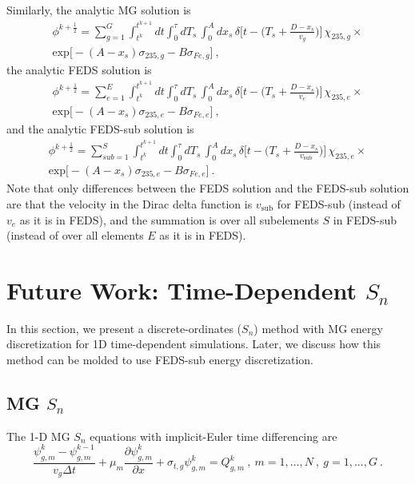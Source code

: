 \documentclass{article}
\begin{document}
Similarly, the analytic MG solution is 
\begin{multline}
\phi^{k+\frac{1}{2}} = \sum_{g=1}^G \int_{t^{k}}^{t^{k+1}} dt \int_0^{\tau} dT_s \, \int_0^A dx_s \, \delta\Big[t - \Big(T_s + \frac{D-x_s}{v_g}\Big)\Big] \, \chi_{235,g} \times \\ \text{exp}\big[-(A - x_s) \sigma_{235,g} - B \sigma_{Fe,g}\big]  \: ,
\end{multline}
the analytic FEDS solution is 
\begin{multline}
\phi^{k+\frac{1}{2}} = \sum_{e=1}^E \int_{t^{k}}^{t^{k+1}} dt \int_0^{\tau} dT_s \, \int_0^A dx_s \, \delta\Big[t - \Big(T_s + \frac{D-x_s}{v_e}\Big)\Big] \, \chi_{235,e} \times \\ \text{exp}\big[-(A - x_s) \sigma_{235,e} - B \sigma_{Fe,e}\big]  \: ,
\end{multline}
and the analytic FEDS-sub solution is 
\begin{multline}
\phi^{k+\frac{1}{2}} = \sum_{sub=1}^S \int_{t^{k}}^{t^{k+1}} dt \int_0^{\tau} dT_s \, \int_0^A dx_s \, \delta\Big[t - \Big(T_s + \frac{D-x_s}{v_\text{sub}}\Big)\Big] \, \chi_{235,e} \times \\ \text{exp}\big[-(A - x_s) \sigma_{235,e} - B \sigma_{Fe,e}\big]  \: .
\end{multline}
Note that only differences between the FEDS solution and the FEDS-sub solution are that the velocity in the Dirac delta function is $v_\text{sub}$ for FEDS-sub (instead of $v_e$ as it is in FEDS), and the summation is over all subelements $S$ in FEDS-sub (instead of over all elements $E$ as it is in FEDS).

\pagebreak

\section{Future Work: Time-Dependent $S_n$}

In this section, we present a discrete-ordinates ($S_n$) method with MG energy discretization for 1D time-dependent simulations. Later, we discuss how this method can be molded to use FEDS-sub energy discretization.

\subsection{MG $S_n$}

The 1-D MG $S_n$ equations with implicit-Euler time differencing are
\begin{equation}
\frac{\psi^{k}_{g,m} - \psi^{k-1}_{g,m}}{v_g \Delta t} + \mu_m \frac{\partial \psi^{k}_{g,m}}{\partial x} + \sigma_{t,g} \psi^{k}_{g,m}  = Q^{k}_{g,m}  \:,  \: m=1,...,N \:, \: g=1,...,G \: .
\end{equation}
\end{document}
